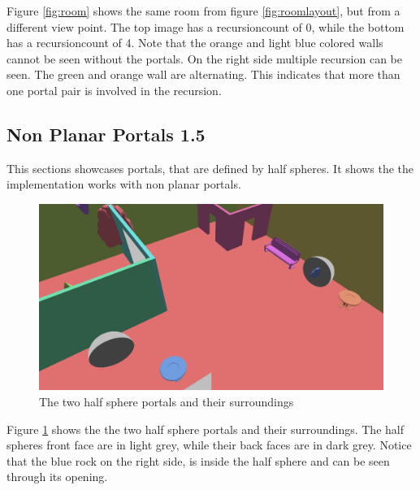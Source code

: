 Figure \ref{fig:room} shows the same room from figure \ref{fig:roomlayout}, but from a different view point. The top image has a \gls{recursioncount} of 0, while the bottom has a \gls{recursioncount} of 4. Note that the orange and light blue colored walls cannot be seen without the portals. On the right side multiple recursion can be seen. The green and orange wall are alternating. This indicates that more than one portal pair is involved in the recursion.

\subsection{Non Planar Portals 1.5}
\label{section:nonplanar}

This sections showcases portals, that are defined by half spheres. It shows the the implementation works with non planar portals.

\begin{figure}[H]
	\includegraphics[width=\linewidth]{images/nonplanarlayout.png}
	\caption{The two half sphere portals and their surroundings}
	\label{fig:nonplanarlayout}
\end{figure}

Figure \ref{fig:nonplanarlayout} shows the the two half sphere portals and their surroundings. The half spheres front face are in light grey, while their back faces are in dark grey. Notice that the blue rock on the right side, is inside the half sphere and can be seen through its opening.


